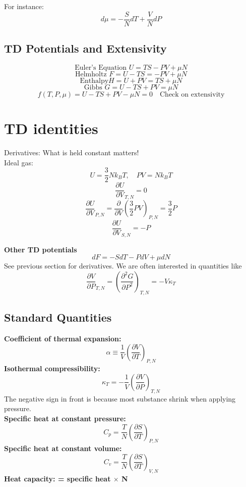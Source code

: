 \documentclass[11pt]{book}
\theoremstyle{definition}
\begin{document}
For instance:
\[ d\mu = -\frac{S}{N}dT + \frac{V}{N}dP\] 

\subsection{TD Potentials and Extensivity}
\[ \text{Euler's Equation } U = TS - PV + \mu N  \]
\[ \text{Helmholtz } F = U -TS = -PV+\mu N \] 
\[ \text{Enthalpy} H = U+PV = TS + \mu N \] 
\[ \text{Gibbs } G = U-TS +PV = \mu N \] 
\[ f(T,P,\mu) = U-TS+PV-\mu N  = 0 \quad \text{Check on extensivity} \] 


\section{TD identities}
Derivatives: What is held constant matters! \\
Ideal gas:
\[ U = \frac{3}{2}Nk_BT, \quad PV=Nk_BT \] 
\[ \frac{\partial U}{\partial V}_{T,N} = 0 \] 
\[ \frac{\partial U}{\partial V}_{P,N} = \frac{\partial }{\partial V}(\frac{3}{2}PV)_{P,N} = \frac{3}{2}P \] 
\[ \frac{\partial U}{\partial V}_{S,N} = -P \] 

\textbf{Other TD potentials} 
\[ dF = -SdT - PdV + \mu dN \] 
See previous section for derivatives.
We are often interested in quantities like
\[ \frac{\partial V}{\partial P}_{T,N} = \left( \frac{\partial ^2 G}{\partial P^2} \right )_{T,N} = - V\kappa _T\] 
\subsection{Standard Quantities}
\textbf{Coefficient of thermal expansion:}
\begin{equation}
	\alpha \equiv \frac{1}{V}\left( \frac{\partial V}{\partial T} \right) _{P,N}
\end{equation}
\textbf{Isothermal compressibility:}
\begin{equation}
	\kappa _T = - \frac{1}{V}\left( \frac{\partial V}{\partial P} \right) _{T,N}
\end{equation}
The negative sign in front is because most substance shrink when applying pressure. \\
\textbf{Specific heat at constant pressure:} 
\begin{equation}
	C_p = \frac{T}{N} \left (\frac{\partial S}{\partial T} \right )_{P,N}
\end{equation}
\textbf{Specific heat at constant volume:} 
\begin{equation}
	C_v = \frac{T}{N}\left( \frac{\partial S}{\partial T} \right)_{V,N}
\end{equation}
\textbf{Heat capacity: = specific heat $ \times $ N}  
\end{document}
